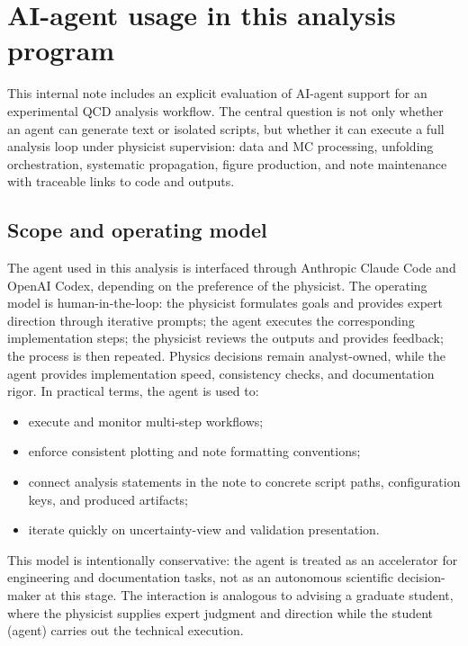 \section{AI-agent usage in this analysis program}
\label{sec:ai_agent}

This internal note includes an explicit evaluation of AI-agent support for an
experimental QCD analysis workflow. The central question is not only whether an
agent can generate text or isolated scripts, but whether it can execute a full
analysis loop under physicist supervision: data and MC processing, unfolding
orchestration, systematic propagation, figure production, and note maintenance
with traceable links to code and outputs.

\subsection{Scope and operating model}

The agent used in this analysis is interfaced through Anthropic Claude Code and OpenAI Codex, depending on the preference of the physicist.
The operating model is human-in-the-loop: the physicist formulates goals and
provides expert direction through iterative prompts; the agent executes the
corresponding implementation steps; the physicist reviews the outputs and
provides feedback; the process is then repeated. Physics decisions remain
analyst-owned, while the agent provides implementation speed, consistency
checks, and documentation rigor. In practical terms, the agent is used to:
\begin{itemize}
\item execute and monitor multi-step workflows;
\item enforce consistent plotting and note formatting conventions;
\item connect analysis statements in the note to concrete script paths,
      configuration keys, and produced artifacts;
\item iterate quickly on uncertainty-view and validation presentation.
\end{itemize}

This model is intentionally conservative: the agent is treated as an
accelerator for engineering and documentation tasks, not as an autonomous scientific decision-maker at this stage. The interaction is analogous to advising a graduate student, where the physicist supplies expert judgment and direction while the student (agent) carries out the technical execution.

